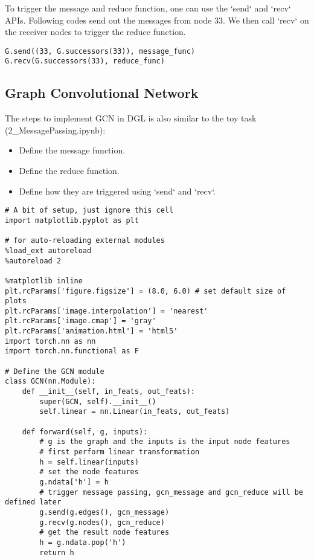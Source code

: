 To trigger the message and reduce function, one can use the `send` and `recv` APIs. Following codes send out the messages from node 33. We then call `recv` on the receiver nodes to trigger the reduce function.

\begin{verbatim}
G.send((33, G.successors(33)), message_func)
G.recv(G.successors(33), reduce_func)
\end{verbatim}

\subsection{Graph Convolutional Network}
The steps to implement GCN in DGL is also similar to the toy task (2_MessagePassing.ipynb):

\begin{itemize}
    \item Define the message function.
\item Define the reduce function.
\item Define how they are triggered using `send` and `recv`.
\end{itemize}

\begin{verbatim}
# A bit of setup, just ignore this cell
import matplotlib.pyplot as plt

# for auto-reloading external modules
%load_ext autoreload
%autoreload 2

%matplotlib inline
plt.rcParams['figure.figsize'] = (8.0, 6.0) # set default size of plots
plt.rcParams['image.interpolation'] = 'nearest'
plt.rcParams['image.cmap'] = 'gray'
plt.rcParams['animation.html'] = 'html5'
import torch.nn as nn
import torch.nn.functional as F

# Define the GCN module
class GCN(nn.Module):
    def __init__(self, in_feats, out_feats):
        super(GCN, self).__init__()
        self.linear = nn.Linear(in_feats, out_feats)
    
    def forward(self, g, inputs):
        # g is the graph and the inputs is the input node features
        # first perform linear transformation
        h = self.linear(inputs)
        # set the node features
        g.ndata['h'] = h
        # trigger message passing, gcn_message and gcn_reduce will be defined later
        g.send(g.edges(), gcn_message)
        g.recv(g.nodes(), gcn_reduce)
        # get the result node features
        h = g.ndata.pop('h')
        return h
\end{verbatim}